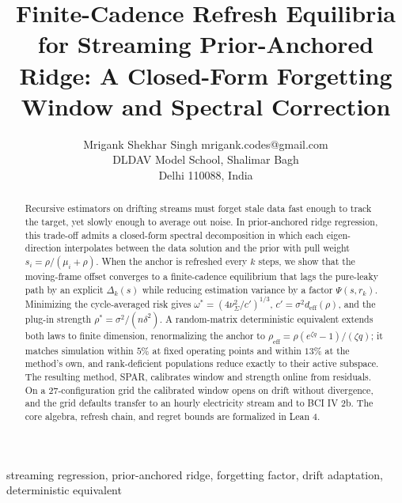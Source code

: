\documentclass[twoside,11pt]{article}
\begin{document}
\title{Finite-Cadence Refresh Equilibria for Streaming Prior-Anchored Ridge: A Closed-Form Forgetting Window and Spectral Correction}
\author{\name Mrigank Shekhar Singh \email mrigank.codes@gmail.com \\
        \addr DLDAV Model School, Shalimar Bagh\\
        Delhi 110088, India}
\editor{}
\maketitle
\begin{abstract}%
Recursive estimators on drifting streams must forget stale data fast enough to track the target, yet slowly enough to average out noise.
In prior-anchored ridge regression, this trade-off admits a closed-form spectral decomposition in which each eigen-direction interpolates between the data solution and the prior with pull weight $s_i=\rho/(\mu_i+\rho)$.
When the anchor is refreshed every $k$ steps, we show that the moving-frame offset converges to a finite-cadence equilibrium that lags the pure-leaky path by an explicit $\Delta_k(s)$ while reducing estimation variance by a factor $\Psi(s,r_k)$.
Minimizing the cycle-averaged risk gives $\omega^*=(4\nu^2_\Sigma/c')^{1/3}$, $c'=\sigma^2d_{\mathrm{eff}}(\rho)$, and the plug-in strength $\rho^*=\sigma^2/(n\delta^2)$.
A random-matrix deterministic equivalent extends both laws to finite dimension, renormalizing the anchor to $\rho_{\mathrm{eff}}=\rho(e^{\zeta q}-1)/(\zeta q)$; it matches simulation within $5\%$ at fixed operating points and within $13\%$ at the method's own, and rank-deficient populations reduce exactly to their active subspace.
The resulting method, SPAR, calibrates window and strength online from residuals.
On a 27-configuration grid the calibrated window opens on drift without divergence, and the grid defaults transfer to an hourly electricity stream and to BCI IV 2b.
The core algebra, refresh chain, and regret bounds are formalized in Lean 4.
\end{abstract}

\begin{keywords}
streaming regression, prior-anchored ridge, forgetting factor, drift adaptation, deterministic equivalent
\end{keywords}
\end{document}
